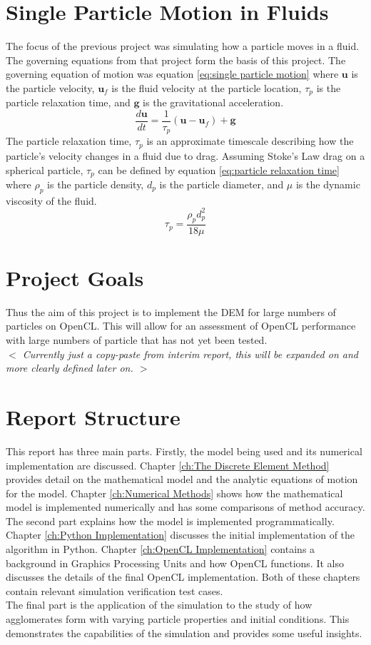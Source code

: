 \documentclass[10pt,a4paper,titlepage]{report}
\begin{document}
\section{Single Particle Motion in Fluids}
\label{sec:Single Particle Motion in Fluids}
The focus of the previous project was simulating how a particle moves in a fluid. The governing equations from that project form the basis of this project. The governing equation of motion was equation \ref{eq:single particle motion} where $\mathbf{u}$ is the particle velocity, $\mathbf{u}_f$ is the fluid velocity at the particle location, $\tau_p$ is the particle relaxation time, and $\mathbf{g}$ is the gravitational acceleration.
\begin{equation}
\label{eq:single particle motion}
\dfrac{d\mathbf{u}}{dt} = \dfrac{1}{\tau_p}(\mathbf{u} - \mathbf{u}_f) + \mathbf{g}
\end{equation}
The particle relaxation time, $\tau_p$ is an approximate timescale describing how the particle's velocity changes in a fluid due to drag. Assuming Stoke's Law drag on a spherical particle, $\tau_p$ can be defined by equation \ref{eq:particle relaxation time} where $\rho_p$ is the particle density, $d_p$ is the particle diameter, and $\mu$ is the dynamic viscosity of the fluid.
\begin{equation}
\label{eq:particle relaxation time}
\tau_{p} = \dfrac{\rho_{p} d^{2}_{p}}{18 \mu}
\end{equation}
\section{Project Goals}
Thus the aim of this project is to implement the DEM for large numbers of particles on OpenCL. This will allow for an assessment of OpenCL performance with large numbers of particle that has not yet been tested.
\\\textit{$<$ Currently just a copy-paste from interim report, this will be expanded on and more clearly defined later on. $>$}
\section{Report Structure}
This report has three main parts. Firstly, the model being used and its numerical implementation are discussed. Chapter \ref{ch:The Discrete Element Method} provides detail on the mathematical model and the analytic equations of motion for the model. Chapter \ref{ch:Numerical Methods} shows how the mathematical model is implemented numerically and has some comparisons of method accuracy.
\\The second part explains how the model is implemented programmatically. Chapter \ref{ch:Python Implementation} discusses the initial implementation of the algorithm in Python. Chapter \ref{ch:OpenCL Implementation} contains a background in Graphics Processing Units and how OpenCL functions. It also discusses the details of the final OpenCL implementation. Both of these chapters contain relevant simulation verification test cases.
\\The final part is the application of the simulation to the study of how agglomerates form with varying particle properties and initial conditions. This demonstrates the capabilities of the simulation and provides some useful insights.
\end{document}
